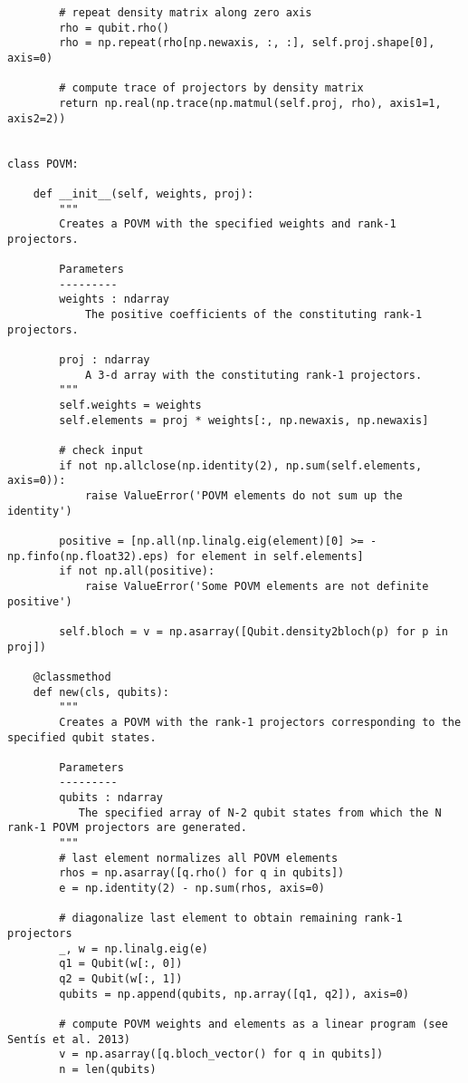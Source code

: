 \begin{verbatim}
        # repeat density matrix along zero axis
        rho = qubit.rho()
        rho = np.repeat(rho[np.newaxis, :, :], self.proj.shape[0], axis=0)

        # compute trace of projectors by density matrix
        return np.real(np.trace(np.matmul(self.proj, rho), axis1=1, axis2=2))


class POVM:

    def __init__(self, weights, proj):
        """
        Creates a POVM with the specified weights and rank-1 projectors.

        Parameters
        ---------
        weights : ndarray
            The positive coefficients of the constituting rank-1 projectors.

        proj : ndarray
            A 3-d array with the constituting rank-1 projectors.
        """
        self.weights = weights
        self.elements = proj * weights[:, np.newaxis, np.newaxis]

        # check input
        if not np.allclose(np.identity(2), np.sum(self.elements, axis=0)):
            raise ValueError('POVM elements do not sum up the identity')

        positive = [np.all(np.linalg.eig(element)[0] >= -np.finfo(np.float32).eps) for element in self.elements]
        if not np.all(positive):
            raise ValueError('Some POVM elements are not definite positive')

        self.bloch = v = np.asarray([Qubit.density2bloch(p) for p in proj])

    @classmethod
    def new(cls, qubits):
        """
        Creates a POVM with the rank-1 projectors corresponding to the specified qubit states.

        Parameters
        ---------
        qubits : ndarray
           The specified array of N-2 qubit states from which the N rank-1 POVM projectors are generated.
        """
        # last element normalizes all POVM elements
        rhos = np.asarray([q.rho() for q in qubits])
        e = np.identity(2) - np.sum(rhos, axis=0)

        # diagonalize last element to obtain remaining rank-1 projectors
        _, w = np.linalg.eig(e)
        q1 = Qubit(w[:, 0])
        q2 = Qubit(w[:, 1])
        qubits = np.append(qubits, np.array([q1, q2]), axis=0)

        # compute POVM weights and elements as a linear program (see Sentís et al. 2013)
        v = np.asarray([q.bloch_vector() for q in qubits])
        n = len(qubits)


\end{verbatim}
